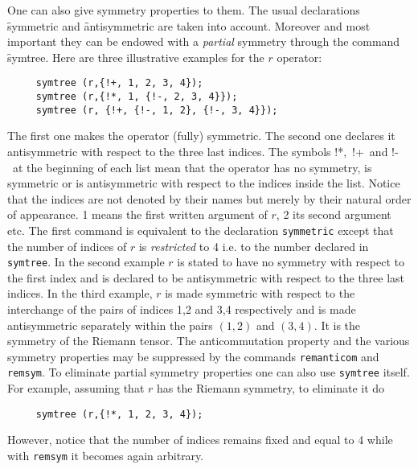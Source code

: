 One can also give symmetry properties to them. The usual declarations
\f{symmetric} and \f{an\-ti\-sym\-me\-tric} are taken into account. Moreover
and most important they can be endowed with a \emph{partial} symmetry 
through the command \f{symtree}.
\hypertarget{command:SYMTREE}{}
Here are three illustrative examples for the $r$ operator:
\begin{verbatim}
     symtree (r,{!+, 1, 2, 3, 4});
     symtree (r,{!*, 1, {!-, 2, 3, 4}});
     symtree (r, {!+, {!-, 1, 2}, {!-, 3, 4}});
\end{verbatim}
The first one makes the operator (fully) symmetric.
The second one declares it antisymmetric with respect 
to the three last indices. 
The symbols !*,\  !+\  and !-\  at the beginning of each list mean that
the operator has no symmetry, is symmetric or is antisymmetric with respect
to the indices inside the list. Notice that the indices are not denoted
by their names but merely by their natural order of appearance. 1 means the
first written argument of $r$, 2 its second argument etc.
The first command is equivalent to the declaration \texttt{symmetric}
except that the number of indices of $r$ is \emph{restricted} to 
4 i.e. to the number declared in \texttt{symtree}.
In the second example $r$  is stated to have no symmetry with respect 
to the  first index and is declared  to be antisymmetric with respect 
to the three last indices. In the third example, $r$ is made symmetric 
with respect to the interchange  of the pairs of indices 1,2 
and 3,4 respectively and is made antisymmetric separately within
the pairs $(1,2)$ and $(3,4)$. It is the symmetry of the Riemann tensor.
The anticommutation property and the various 
symmetry properties may be suppressed by the commands \texttt{remanticom} and 
\texttt{remsym}. To eliminate partial symmetry properties one can also use 
\texttt{symtree}  itself. For example, assuming that $r$ has the Riemann symmetry,
to eliminate it do
\hypertarget{command:REMANTICOM}{}
\hypertarget{command:REMSYM}{}
\begin{verbatim}
     symtree (r,{!*, 1, 2, 3, 4});  
\end{verbatim}
However, notice that the number of indices remains fixed and equal to 4
while with \texttt{remsym} it becomes again arbitrary.
